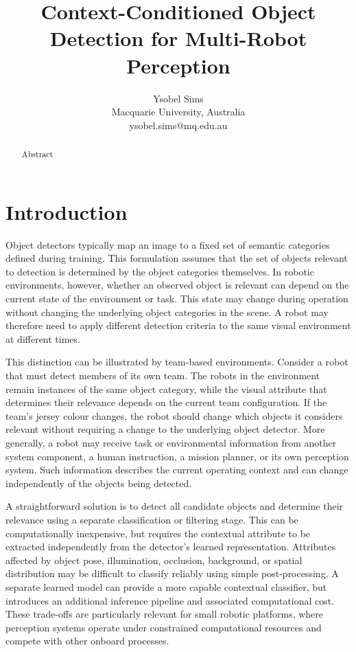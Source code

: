 \documentclass{article}
\title{Context-Conditioned Object Detection for Multi-Robot Perception}
\author{Ysobel Sims \\ Macquarie University, Australia \\ 
ysobel.sims@mq.edu.au}
\begin{document}
\maketitle

\begin{abstract}
Abstract
\end{abstract}

\section{Introduction}

Object detectors typically map an image to a fixed set of semantic categories defined during training. This formulation assumes that the set of objects relevant to detection is determined by the object categories themselves. In robotic environments, however, whether an observed object is relevant can depend on the current state of the environment or task. This state may change during operation without changing the underlying object categories in the scene. A robot may therefore need to apply different detection criteria to the same visual environment at different times.

This distinction can be illustrated by team-based environments. Consider a robot that must detect members of its own team. The robots in the environment remain instances of the same object category, while the visual attribute that determines their relevance depends on the current team configuration. If the team's jersey colour changes, the robot should change which objects it considers relevant without requiring a change to the underlying object detector. More generally, a robot may receive task or environmental information from another system component, a human instruction, a mission planner, or its own perception system. Such information describes the current operating context and can change independently of the objects being detected.

A straightforward solution is to detect all candidate objects and determine their relevance using a separate classification or filtering stage. This can be computationally inexpensive, but requires the contextual attribute to be extracted independently from the detector's learned representation. Attributes affected by object pose, illumination, occlusion, background, or spatial distribution may be difficult to classify reliably using simple post-processing. A separate learned model can provide a more capable contextual classifier, but introduces an additional inference pipeline and associated computational cost. These trade-offs are particularly relevant for small robotic platforms, where perception systems operate under constrained computational resources and compete with other onboard processes.
\end{document}
